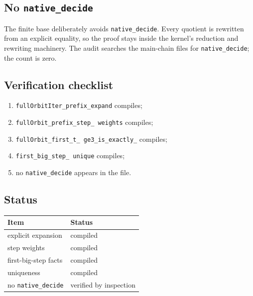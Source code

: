 \subsection{No \texttt{native\_decide}}

The finite base deliberately avoids \texttt{native\_decide}.  Every
quotient is rewritten from an explicit equality, so the proof stays
inside the kernel's reduction and rewriting machinery.  The audit
searches the main-chain files for \texttt{native\_decide}; the count
is zero.

\subsection{Verification checklist}

\begin{enumerate}[leftmargin=*]
\item \texttt{fullOrbitIter\_\allowbreak prefix\_\allowbreak expand}
  compiles;
\item \texttt{fullOrbit\_\allowbreak prefix\_\allowbreak step\_\allowbreak
  weights} compiles;
\item \texttt{fullOrbit\_\allowbreak first\_\allowbreak t\_\allowbreak
  ge3\_\allowbreak is\_\allowbreak exactly\_} compiles;
\item \texttt{first\_\allowbreak big\_\allowbreak step\_\allowbreak
  unique} compiles;
\item no \texttt{native\_decide} appears in the file.
\end{enumerate}

\subsection{Status}

\begin{center}
\small
\begin{tabular}{@{}p{}p{}@{}}
\toprule
Item & Status \\
\midrule
explicit expansion & compiled \\
step weights & compiled \\
first-big-step facts & compiled \\
uniqueness & compiled \\
no \texttt{native\_decide} & verified by inspection \\
\bottomrule
\end{tabular}
\end{center}
